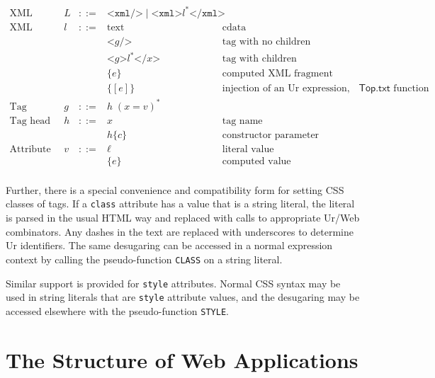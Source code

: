 \documentclass{article}
\newcommand{\cd}[1]{\texttt{#1}}
\newcommand{\mt}[1]{\mathsf{#1}}
\begin{document}
$$\begin{array}{rrcll}
  \textrm{XML fragments} & L &::=& \texttt{<xml/>} \mid \texttt{<xml>}l^*\texttt{</xml>} \\
  \textrm{XML pieces} & l &::=& \textrm{text} & \textrm{cdata} \\
  &&& \texttt{<}g\texttt{/>} & \textrm{tag with no children} \\
  &&& \texttt{<}g\texttt{>}l^*\texttt{</}x\texttt{>} & \textrm{tag with children} \\
  &&& \{e\} & \textrm{computed XML fragment} \\
  &&& \{[e]\} & \textrm{injection of an Ur expression, via the $\mt{Top}.\mt{txt}$ function} \\
  \textrm{Tag} & g &::=& h \; (x = v)^* \\
  \textrm{Tag head} & h &::=& x & \textrm{tag name} \\
  &&& h\{c\} & \textrm{constructor parameter} \\
  \textrm{Attribute value} & v &::=& \ell & \textrm{literal value} \\
  &&& \{e\} & \textrm{computed value} \\
\end{array}$$

Further, there is a special convenience and compatibility form for setting CSS classes of tags.  If a \cd{class} attribute has a value that is a string literal, the literal is parsed in the usual HTML way and replaced with calls to appropriate Ur/Web combinators.  Any dashes in the text are replaced with underscores to determine Ur identifiers.  The same desugaring can be accessed in a normal expression context by calling the pseudo-function \cd{CLASS} on a string literal.

Similar support is provided for \cd{style} attributes.  Normal CSS syntax may be used in string literals that are \cd{style} attribute values, and the desugaring may be accessed elsewhere with the pseudo-function \cd{STYLE}.

\section{\label{structure}The Structure of Web Applications}
\end{document}
